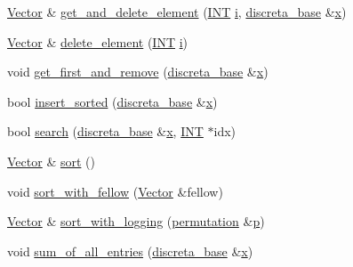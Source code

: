 \begin{DoxyCompactItemize}
\item 
\mbox{\hyperlink{class_vector}{Vector}} \& \mbox{\hyperlink{class_vector_a075b82bb136a3fad137b9c8dfb1da4c9}{get\+\_\+and\+\_\+delete\+\_\+element}} (\mbox{\hyperlink{galois_8h_a09fddde158a3a20bd2dcadb609de11dc}{I\+NT}} \mbox{\hyperlink{alphabet2_8_c_acb559820d9ca11295b4500f179ef6392}{i}}, \mbox{\hyperlink{classdiscreta__base}{discreta\+\_\+base}} \&\mbox{\hyperlink{alphabet2_8_c_a6150e0515f7202e2fb518f7206ed97dc}{x}})
\item 
\mbox{\hyperlink{class_vector}{Vector}} \& \mbox{\hyperlink{class_vector_a91dbd1d04baeec1066d397e7668953e3}{delete\+\_\+element}} (\mbox{\hyperlink{galois_8h_a09fddde158a3a20bd2dcadb609de11dc}{I\+NT}} \mbox{\hyperlink{alphabet2_8_c_acb559820d9ca11295b4500f179ef6392}{i}})
\item 
void \mbox{\hyperlink{class_vector_ad2f9bf9820e09ff09e3c99d1c983ab96}{get\+\_\+first\+\_\+and\+\_\+remove}} (\mbox{\hyperlink{classdiscreta__base}{discreta\+\_\+base}} \&\mbox{\hyperlink{alphabet2_8_c_a6150e0515f7202e2fb518f7206ed97dc}{x}})
\item 
bool \mbox{\hyperlink{class_vector_a7c0bbf84cd12a6c7f632789764deb68e}{insert\+\_\+sorted}} (\mbox{\hyperlink{classdiscreta__base}{discreta\+\_\+base}} \&\mbox{\hyperlink{alphabet2_8_c_a6150e0515f7202e2fb518f7206ed97dc}{x}})
\item 
bool \mbox{\hyperlink{class_vector_a0b2bba0162e65dffa24b4e4660bfd4e2}{search}} (\mbox{\hyperlink{classdiscreta__base}{discreta\+\_\+base}} \&\mbox{\hyperlink{alphabet2_8_c_a6150e0515f7202e2fb518f7206ed97dc}{x}}, \mbox{\hyperlink{galois_8h_a09fddde158a3a20bd2dcadb609de11dc}{I\+NT}} $\ast$idx)
\item 
\mbox{\hyperlink{class_vector}{Vector}} \& \mbox{\hyperlink{class_vector_ae50ef8643d10e954cb3b34cb33ce97e9}{sort}} ()
\item 
void \mbox{\hyperlink{class_vector_a689bf0a0797099e26f9b40d07cfd1b9c}{sort\+\_\+with\+\_\+fellow}} (\mbox{\hyperlink{class_vector}{Vector}} \&fellow)
\item 
\mbox{\hyperlink{class_vector}{Vector}} \& \mbox{\hyperlink{class_vector_a5bcaeb8778ea91df5f29f9f3eb9913d4}{sort\+\_\+with\+\_\+logging}} (\mbox{\hyperlink{classpermutation}{permutation}} \&\mbox{\hyperlink{alphabet2_8_c_a533391314665d6bf1b5575e9a9cd8552}{p}})
\item 
void \mbox{\hyperlink{class_vector_a82d3a4637450aa25030d4fd9bfff0642}{sum\+\_\+of\+\_\+all\+\_\+entries}} (\mbox{\hyperlink{classdiscreta__base}{discreta\+\_\+base}} \&\mbox{\hyperlink{alphabet2_8_c_a6150e0515f7202e2fb518f7206ed97dc}{x}})

\end{DoxyCompactItemize}

